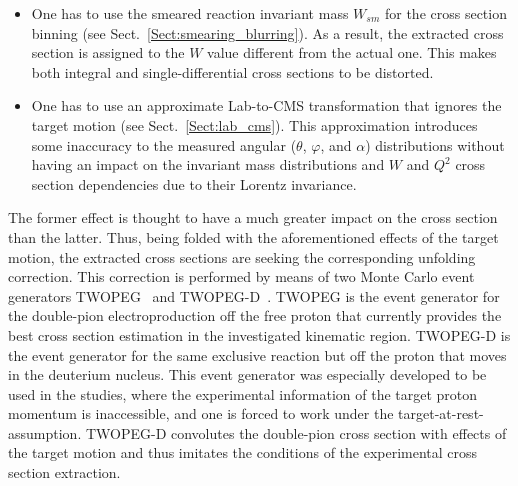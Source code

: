 \begin{itemize}

\item  One has to use the smeared reaction invariant mass $W_{sm}$ for the cross section binning (see Sect.~\ref{Sect:smearing_blurring}). As a result, the extracted cross section is assigned to the $W$ value different from the actual one. This makes both integral and single-differential cross sections to be distorted. 

\item  One has to use an approximate Lab-to-CMS transformation that ignores the target motion (see Sect.~\ref{Sect:lab_cms}). This approximation introduces some inaccuracy to the measured angular ($\theta$, $\varphi$, and $\alpha$) distributions without having an impact on the invariant mass distributions and $W$ and $Q^{2}$ cross section dependencies due to their Lorentz invariance. 

\end{itemize}

The former effect is thought to have a much greater impact on the cross section than the latter. Thus, being folded with the aforementioned effects of the target motion, the extracted cross sections are seeking the corresponding unfolding correction. This correction is performed by means of two Monte Carlo event generators TWOPEG~\cite{twopeg} and TWOPEG-D~\cite{twopeg-d}. TWOPEG is the event generator for the double-pion electroproduction off the free proton that currently provides the best cross section estimation in the investigated kinematic region. TWOPEG-D is the event generator for the same exclusive reaction but off the proton that moves in the deuterium nucleus. This event generator was especially developed to be used in the studies, where the experimental information of the target proton momentum is inaccessible, and one is forced to work under the target-at-rest-assumption. TWOPEG-D convolutes the double-pion cross section with effects of the target motion and thus imitates the conditions of the experimental cross section extraction.

